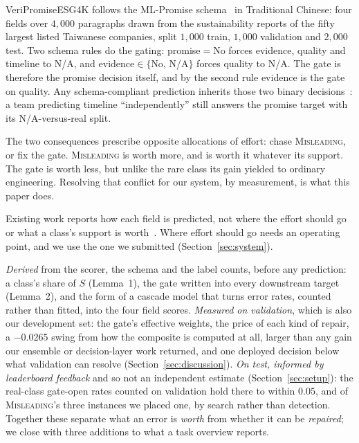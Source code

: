 VeriPromiseESG4K follows the ML-Promise schema~\cite{seki2025mlpromise} in Traditional Chinese:
four fields over $4{,}000$ paragraphs drawn from the sustainability reports of the fifty largest
listed Taiwanese companies, split $1{,}000$ train, $1{,}000$ validation and $2{,}000$ test. Two
schema rules do the gating: promise${=}$No forces evidence, quality and timeline to N/A, and
evidence$\in\{$No, N/A$\}$ forces quality to N/A. The gate is therefore the promise decision
itself, and by the second rule evidence is the gate on quality. Any schema-compliant prediction
inherits those two binary decisions~\cite{silla2011survey}: a team predicting timeline
``independently'' still answers the promise target with its N/A-versus-real split.

The two consequences prescribe opposite allocations of effort: chase \textsc{Misleading}, or fix
the gate. \textsc{Misleading} is worth more, and is worth it whatever its support. The gate is
worth less, but unlike the rare class its gain yielded to ordinary engineering. Resolving
that conflict for our system, by measurement, is what this paper does.

Existing work reports how each field is predicted, not where the effort should go or what a
class's support is worth~\cite{wu2025cyut,nishi2025wcteam,leesombatwathana2025cscu}. Where effort
should go needs an operating point, and we use the one we submitted (Section~\ref{sec:system}).

 \emph{Derived} from the scorer, the schema and
the label counts, before any prediction: a class's share of $S$ (Lemma~1), the gate written into
every downstream target (Lemma~2), and the form of a cascade model that turns error rates,
counted rather than fitted, into the four field scores. \emph{Measured on validation},
which is also our development set: the gate's effective weights, the price of each kind of
repair, a $-0.0265$ swing from how the composite is computed at all, larger than any gain our
ensemble or decision-layer work returned, and one deployed decision below what validation can
resolve (Section~\ref{sec:discussion}). \emph{On test, informed by leaderboard feedback} and so
not an independent estimate (Section~\ref{sec:setup}): the real-class gate-open rates counted on
validation hold there to within $0.05$, and of \textsc{Misleading}'s three instances we placed one, by search rather than
detection. Together these separate what an error is \emph{worth} from whether it can be
\emph{repaired}; we close with three additions to what a task overview reports.
